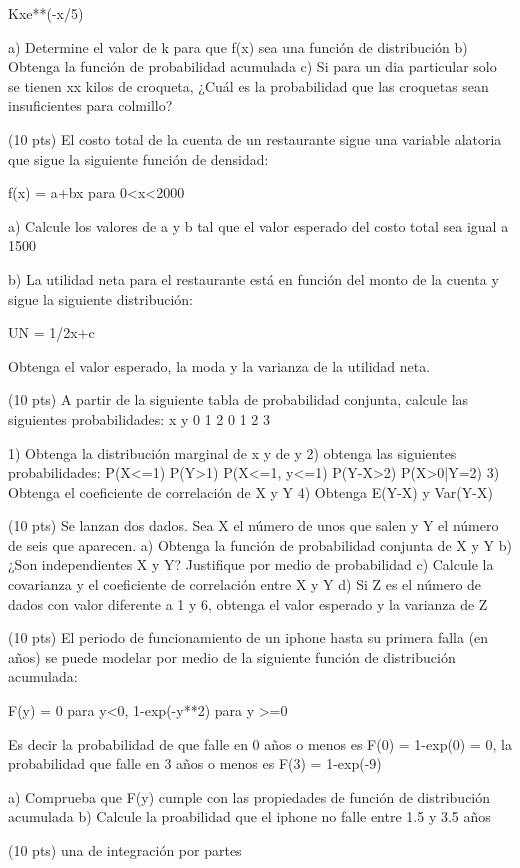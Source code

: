 \documentclass[addpoints]{exam}
\theoremstyle{mytheor}
\begin{document}
\begin{questions}
Kxe**(-x/5)

a) Determine el valor de k para que f(x) sea una función de distribución
b) Obtenga la función de probabilidad acumulada
c) Si para un dia particular solo se tienen xx kilos de croqueta, ¿Cuál es la probabilidad que las croquetas sean insuficientes para colmillo?

\question (10 pts) 
El costo total de la cuenta de un restaurante sigue una variable alatoria que sigue la siguiente función de densidad:

f(x) = a+bx  para 0<x<2000

a) Calcule los valores de a y b tal que el valor esperado del costo total sea igual a 1500

b) La utilidad neta para el restaurante está en función del monto de la cuenta y sigue la siguiente distribución: 

UN = 1/2x+c

Obtenga el valor esperado, la moda y la varianza de la utilidad neta.

\question (10 pts) 
A partir de la siguiente tabla de probabilidad conjunta, calcule las siguientes probabilidades:
     x
y  0 1 2 
0
1
2
3

1) Obtenga la distribución marginal de x y de y
2) obtenga las siguientes probabilidades:
P(X<=1)
P(Y>1)
P(X<=1, y<=1)
P(Y-X>2)
P(X>0|Y=2)
3) Obtenga el coeficiente de correlación de X y Y
4) Obtenga E(Y-X) y Var(Y-X)

\question (10 pts) 
Se lanzan dos dados. Sea X el número de unos que salen y Y el número de seis que aparecen.
a) Obtenga la función de probabilidad conjunta de X y Y
b) ¿Son independientes X y Y? Justifique por medio de probabilidad
c) Calcule la covarianza y el coeficiente de correlación entre X y Y
d) Si Z es el número de dados con valor diferente a 1 y 6, obtenga el valor esperado y la varianza de Z

\question (10 pts) 
El periodo de funcionamiento de un iphone hasta su primera falla (en años) se puede modelar por medio de la siguiente función de distribución acumulada:

F(y) = 0 para y<0, 1-exp(-y**2) para y >=0

Es decir la probabilidad de que falle en 0 años o menos es F(0) = 1-exp(0) = 0, la probabilidad que falle en 3 años o menos es F(3) = 1-exp(-9)

a) Comprueba que F(y) cumple con las propiedades de función de distribución acumulada
b) Calcule la proabilidad que el iphone no falle entre 1.5 y 3.5 años


\question (10 pts) 
una de integración por partes





\end{questions} 
\end{document}
